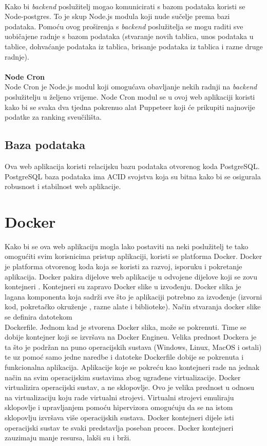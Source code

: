 \documentclass[times, utf8, zavrsni]{fer}
\begin{document}
\\ Kako bi \emph{backend} poslužitelj mogao komunicirati s bazom podataka koristi se Node-postgres. To je skup Node.js modula koji nude 
sučelje prema bazi podataka. Pomoću ovog proširenja s \emph{backend} poslužitelja se mogu raditi sve uobičajene radnje s bazom podataka (stvaranje novih tablica, 
unos podataka u tablice, dohvaćanje podataka iz tablica, brisanje podataka iz tablica i razne druge radnje).
\\ \\ \textbf{Node Cron}
\\ Node Cron je Node.js modul koji omogućava obavljanje nekih radnji na \emph{backend} poslužitelju u željeno vrijeme. Node Cron modul se u ovoj 
web aplikaciji koristi kako bi se svaka dva tjedna pokrenuo alat Puppeteer koji će prikupiti najnovije podatke za ranking sveučilišta.
\\ \subsection{Baza podataka}Ova web aplikacija koristi relacijsku bazu podataka otvorenog koda PostgreSQL. \\PostgreSQL baza podataka ima ACID 
 svojstva koja su bitna kako bi se osigurala robusnost i stabilnost web aplikacije.
\\ \section{Docker}
Kako bi se ova web aplikaciju mogla lako postaviti  na neki poslužitelj te tako omogućiti svim korisnicima pristup aplikaciji,
koristi se platforma Docker. Docker je platforma otvorenog koda koja se koristi za razvoj, isporuku i pokretanje aplikacija.
Docker pakira dijelove web aplikacije u odvojene dijelove koji se zovu kontejneri .
Kontejneri su zapravo Docker slike  u izvođenju. Docker slika je lagana  komponenta koja sadrži sve što je aplikaciji 
potrebno za izvođenje (izvorni kod, pokretačko okruženje , razne alate i biblioteke). Način stvaranja docker slike se definira 
datotekom \\Dockerfile. Jednom kad je stvorena Docker slika, može se pokrenuti. Time se dobije kontejner koji se izvršava na Docker Engineu. 
Velika prednost Dockera je ta što je podržan na puno operacijskih sustava (Windows, Linux, MacOS i ostali) te uz pomoć samo jedne naredbe i datoteke Dockerfile
dobije se pokrenuta i funkcionalna aplikacija. Aplikacije koje se pokreću kao kontejneri rade na jednak način na svim operacijskim sustavima zbog ugrađene virtualizacije.
Docker virtualizira operacijski sustav, a ne sklopovlje. Ovo je velika prednost u odnosu na virtualizaciju koju rade virtualni strojevi. 
Virtualni strojevi emuliraju sklopovlje i upravljanjem pomoću hipervizora omogućuju da se na istom sklopovlju izvršava više operacijskih sustava. 
Docker kontejneri dijele isti operacijski sustav te svaki predstavlja poseban proces. Docker kontejneri zauzimaju manje 
resursa, lakši su i brži. 
\end{document}
